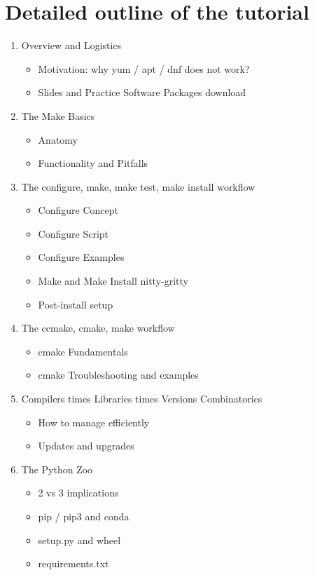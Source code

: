 \documentclass{report}
\begin{document}
\section*{Detailed outline of the tutorial}
\begin{enumerate}
\item Overview and Logistics
  \begin{itemize}
    \item Motivation: why yum / apt / dnf does not work? 
    \item Slides and Practice Software Packages download
  \end{itemize}
\item The Make Basics
  \begin{itemize}
    \item Anatomy
    \item Functionality and Pitfalls
  \end{itemize}
\item The configure, make, make test, make install workflow
  \begin{itemize}
    \item Configure Concept
    \item Configure Script
    \item Configure Examples
    \item Make and Make Install nitty-gritty
    \item Post-install setup
  \end{itemize}
\item The ccmake, cmake, make workflow
    \begin{itemize}
      \item cmake Fundamentals
      \item cmake Troubleshooting and examples
    \end{itemize}
\item Compilers times Libraries times Versions Combinatorics
  \begin{itemize}
    \item How to manage efficiently
    \item Updates and upgrades
  \end{itemize}
\item The Python Zoo
  \begin{itemize}
    \item 2 vs 3 implications
    \item pip / pip3 and conda
    \item setup.py and wheel
    \item requirements.txt

\end{itemize}
\end{enumerate}
\end{document}
